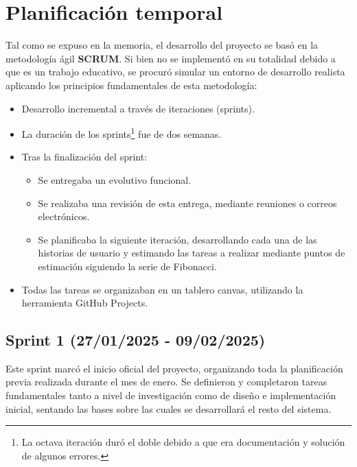 \section{Planificación temporal}
\label{sec:Planificacion}
Tal como se expuso en la memoria, el desarrollo del proyecto se basó en la metodología ágil \textbf{SCRUM}. Si bien no se implementó en su totalidad debido a que es un trabajo educativo, se procuró simular un entorno de desarrollo realista aplicando los principios fundamentales de esta metodología:
\begin{itemize}
    \item Desarrollo incremental a través de iteraciones (sprints).
    \item La duración de los sprints\footnote{La octava iteración duró el doble debido a que era documentación y solución de algunos errores.} fue de dos semanas.
    \item Tras la finalización del sprint:
    \begin{itemize}
        \item Se entregaba un evolutivo funcional.
        \item Se realizaba una revisión de esta entrega, mediante reuniones o correos electrónicos.
        \item Se planificaba la siguiente iteración, desarrollando cada una de las historias de usuario y estimando las tareas a realizar mediante puntos de estimación siguiendo la serie de Fibonacci.
    \end{itemize}
    \item Todas las tareas se organizaban en un tablero canvas, utilizando la herramienta GitHub Projects.
\end{itemize}

\subsection{Sprint 1 (27/01/2025 - 09/02/2025)}
\label{subsec:PrimerSprint}
Este sprint marcó el inicio oficial del proyecto, organizando toda la planificación previa realizada durante el mes de enero. Se definieron y completaron tareas fundamentales tanto a nivel de investigación como de diseño e implementación inicial, sentando las bases sobre las cuales se desarrollará el resto del sistema.

